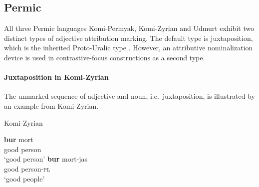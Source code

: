 \subsection{Permic}
All three Permic languages Komi-Permyak, Komi-Zyrian and Udmurt exhibit two distinct types of adjective attribution marking. The default type is juxtaposition, which is the inherited Proto-Uralic type \citep[80–81]{decsy1990}. However, an attributive nominalization device is used in contrastive-focus constructions as a second type.

\paragraph{Juxtaposition in Komi-Zyrian}
The unmarked sequence of adjective and noun, i.e.~juxtaposition, is illustrated by an example from Komi-Zyrian.
\begin{exe}
\ex \rm{Komi-Zyrian \citep[287]{lytkin1966a}}
\begin{xlist} 
\ex
\gll 		\textbf{bur} 	mort\\
		good	person\\
\glt		‘good person’
\ex
\gll		\textbf{bur}	mort-jas\\
		good	person-\textsc{pl}\\
\glt		‘good people’
\end{xlist}
\end{exe}

